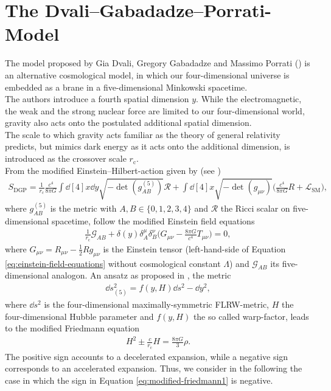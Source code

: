 \chapter{The Dvali--Gabadadze--Porrati-Model}
\label{chap:the-dvali-gabadadze-porrati-model}
\thispagestyle{empty}

The model proposed by Gia Dvali, Gregory Gabadadze and Massimo Porrati (\cite{Dvali2000}) is an alternative cosmological model, in which our four-dimensional universe is embedded as a brane in a five-dimensional Minkowski spacetime. \\
The authors introduce a fourth spatial dimension $y$. While the electromagnetic, the weak and the strong nuclear force are limited to our four-dimensional world, gravity also acts onto the postulated additional spatial dimension. \\
The scale to which gravity acts familiar as the theory of general relativity predicts, but mimics dark energy as it acts onto the additional dimension, is introduced as the crossover scale $r_{\text{c}}$. \\
From the modified Einstein--Hilbert-action given by (see \cite{Dvali2003}) 
\begin{align}
    S_{\text{DGP}} = \frac{1}{r_{\text{c}}} \frac{c^4}{8\pi G} \int \dd[4]{x} \dd{y} \sqrt{-\det(g_{AB}^{(5)})} \mathcal{R} + \int \dd[4]{x} \sqrt{-\det(g_{\mu \nu})} \biggl(\frac{c^4}{8 \pi G} R + \mathcal{L}_{\text{SM}} \biggr),
\end{align}
where $g_{AB}^{(5)}$ is the metric with $A, B \in \{0, 1, 2, 3, 4\}$ and $\mathcal{R}$ the Ricci scalar on five-dimensional spacetime, follow the modified Einstein field equations 
\begin{align}
    \frac{1}{r_{\text{c}}} \mathcal{G}_{AB} + \delta(y) \delta_{A}^{\mu} \delta_{B}^{\nu} \biggl( G_{\mu \nu} - \frac{8\pi G}{c^4} T_{\mu \nu} \biggr) = 0, 
\end{align}
where $G_{\mu \nu} = R_{\mu \nu} - \frac{1}{2} R g_{\mu \nu}$ is the Einstein tensor (left-hand-side of Equation \eqref{eq:einstein-field-equations} without cosmological constant $\Lambda$) and $\mathcal{G}_{AB}$ its five-dimensional analogon. An ansatz as proposed in \cite{Dvali2003}, the metric 
\begin{align}
    \dd{s}_{(5)}^2 = f(y,H) \dd{s}^2 - \dd{y}^2, 
\end{align}
where $\dd{s}^2$ is the four-dimensional maximally-symmetric FLRW-metric, $H$ the four-dimensional Hubble parameter and $f(y, H)$ the so called warp-factor, leads to the modified Friedmann equation
\begin{align}
    H^{2} \pm \frac{c}{r_{\text{c}}}H = \frac{8 \pi G}{3} \rho.  \label{eq:modified-friedmann1}
\end{align}
The positive sign accounts to a decelerated expansion, while a negative sign corresponds to an accelerated expansion. Thus, we consider in the following the case in which the sign in Equation \eqref{eq:modified-friedmann1} is negative. \\

